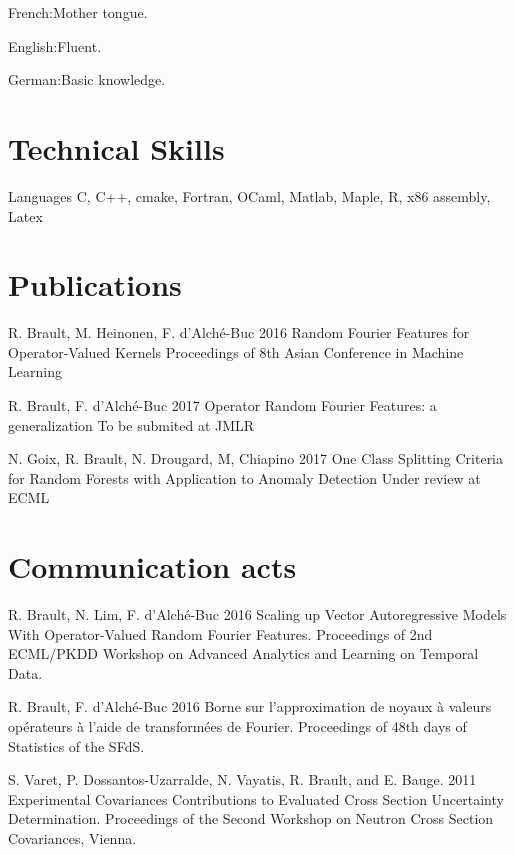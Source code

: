 \documentclass{tccv}
\begin{document}
\begin{factlist}
\item{French:}{Mother tongue.}
\item{English:}{Fluent.}
\item{German:}{Basic knowledge.}
\end{factlist}

\section{Technical Skills}

\begin{factlist}

\item{Languages}
     {C, C++, cmake, Fortran, OCaml, Matlab, Maple, R, x86 assembly, Latex}

\end{factlist}

\cleardoublepage%
\section{Publications}
\begin{yearlist}
\item[R. Brault, M. Heinonen, F. d'Alch\'e-Buc]{2016}
     {Random Fourier Features for Operator-Valued Kernels}
     {Proceedings of 8th Asian Conference in Machine Learning}

\item[R. Brault, F. d'Alch\'e-Buc]{2017}
     {Operator Random Fourier Features: a generalization}
     {To be submited at JMLR}

\item[N. Goix, R. Brault, N. Drougard, M, Chiapino]{2017}
     {One Class Splitting Criteria for Random Forests with Application to
     Anomaly Detection}
     {Under review at ECML}

\end{yearlist}

\section{Communication acts}
\begin{yearlist}
\item[R. Brault, N. Lim, F. d'Alch\'e-Buc]{2016}
     {Scaling up Vector Autoregressive Models With Operator-Valued Random
     Fourier Features.}
     {Proceedings of 2nd ECML/PKDD Workshop on Advanced Analytics and Learning
     on Temporal Data.}

\item[R. Brault, F. d'Alch\'e-Buc]{2016}
     {Borne sur l'approximation de noyaux à valeurs opérateurs à l'aide de
     transformées de Fourier.}
     {Proceedings of 48th days of Statistics of the SFdS.}

\item[S. Varet, P. Dossantos-Uzarralde, N. Vayatis, R. Brault, and E.
Bauge.]{2011}
     {Experimental Covariances Contributions to Evaluated Cross Section
     Uncertainty Determination.}
     {Proceedings of the Second Workshop on Neutron Cross Section Covariances,
     Vienna.}
\end{yearlist}
\end{document}

